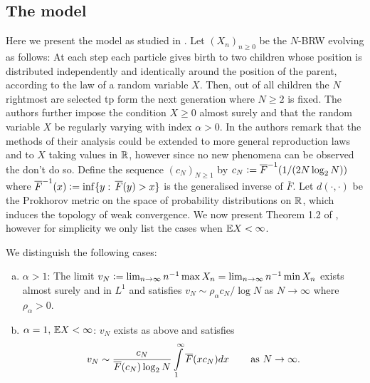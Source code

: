 \subsection{The model}
Here we present the model as studied in \cite{poly_tails}. Let $(X_n)_{n \geq 0}$ be the $N$-BRW evolving as follows: At each step each particle gives birth to two children whose position is distributed independently and identically around the position of the parent, according to the law of a random variable $X$. Then, out of all children the $N$ rightmost are selected tp form the next generation where $N \geq 2$ is fixed. The authors further impose the condition $X \geq 0$ almost surely and that the random variable $X$ be regularly varying with index $\alpha > 0$. In \cite{poly_tails} the authors remark that the methods of their analysis could be extended to more general reproduction laws and to $X$ taking values in $\mathbb{R}$, however since no new phenomena can be observed the don't do so. Define the sequence $(c_N)_{N \geq 1}$ by $c_N \vcentcolon= \overline{F}^{-1} (1/ (2N \log_2 N))$ where $\overline{F}^{-1}(x) \vcentcolon= \inf\{ y :\, \overline{F}(y) > x\}$ is the generalised inverse of $\overline{F}$. Let $d(\cdot, \cdot)$ be the Prokhorov metric on the space of probability distributions on $\mathbb{R}$, which induces the topology of weak convergence. We now present Theorem 1.2 of \cite{poly_tails}, however for simplicity we only list the cases when $\mathbb{E} X < \infty$. 

\begin{theorem}
We distinguish the following cases:
\begin{enumerate}[(a)]

\item \vspace{-2mm} $\alpha > 1$: The limit $v_N \vcentcolon= \lim_{n \to \infty} n^{-1} \max X_n = \lim_{n \to \infty} n^{-1} \min X_n$ exists almost surely and in $L^1$ and satisfies $v_N \sim \rho_\alpha c_N / \log N$ as $N \to \infty$ where $\rho_\alpha > 0$. \\

\item \vspace{-6mm} $\alpha = 1,\, \mathbb{E} X < \infty$: $v_N$ exists as above and satisfies 
\begin{equation}
v_N \sim \frac{c_N}{\overline{F}(c_N)\log_2 N} \int\limits^\infty_1 \overline{F}(x c_N) dx \qquad\,\text{as }N \to \infty. \\
\end{equation}
\end{enumerate}
\end{theorem}

